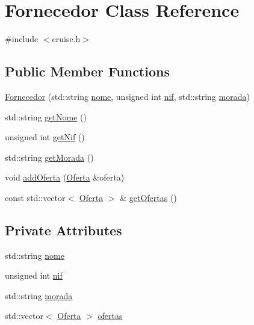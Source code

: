 \hypertarget{classFornecedor}{}\section{Fornecedor Class Reference}
\label{classFornecedor}


{\ttfamily \#include $<$cruise.\+h$>$}

\subsection*{Public Member Functions}
\begin{DoxyCompactItemize}
\item 
\hyperlink{classFornecedor_a0cbc4556289cc946756039ab0da52756}{Fornecedor} (std\+::string \hyperlink{classFornecedor_a5cfef99f616773a241417c6f6f10f016}{nome}, unsigned int \hyperlink{classFornecedor_aa140a16d2ad85470dee138da971d647b}{nif}, std\+::string \hyperlink{classFornecedor_aadc94062dcdf99d07182075f1bee4a46}{morada})
\item 
std\+::string \hyperlink{classFornecedor_a8d14dd862259e29adef0e283f15cbb16}{get\+Nome} ()
\item 
unsigned int \hyperlink{classFornecedor_aec536b071f628fc1aa468071fa5a6067}{get\+Nif} ()
\item 
std\+::string \hyperlink{classFornecedor_ae71fba3a196f749f54956fdbb25ede6a}{get\+Morada} ()
\item 
void \hyperlink{classFornecedor_a220373fd19f44a30d7c6c1ec913be700}{add\+Oferta} (\hyperlink{classOferta}{Oferta} \&oferta)
\item 
const std\+::vector$<$ \hyperlink{classOferta}{Oferta} $>$ \& \hyperlink{classFornecedor_a4b399f19174aa92b1a414c8f706a0811}{get\+Ofertas} ()
\end{DoxyCompactItemize}
\subsection*{Private Attributes}
\begin{DoxyCompactItemize}
\item 
std\+::string \hyperlink{classFornecedor_a5cfef99f616773a241417c6f6f10f016}{nome}
\item 
unsigned int \hyperlink{classFornecedor_aa140a16d2ad85470dee138da971d647b}{nif}
\item 
std\+::string \hyperlink{classFornecedor_aadc94062dcdf99d07182075f1bee4a46}{morada}
\item 
std\+::vector$<$ \hyperlink{classOferta}{Oferta} $>$ \hyperlink{classFornecedor_ad4e0550855bb48c1e25f30ee66716999}{ofertas}
\end{DoxyCompactItemize}


